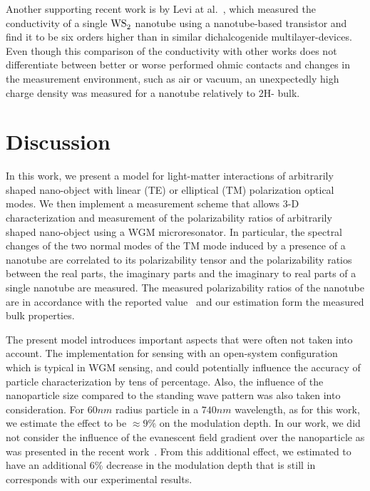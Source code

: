 \documentclass[journal=jacsat,manuscript=article]{achemso}
\begin{document}
Another supporting recent work is by Levi at al.~\cite{levi2013}, which measured the conductivity of a single $\ce{WS_2}$ nanotube using a nanotube-based transistor and find it to be six orders higher than in similar dichalcogenide multilayer-devices. Even though this comparison of the conductivity with other works does not differentiate between better or worse performed ohmic contacts and changes in the measurement environment, such as air or vacuum, an unexpectedly high charge density was measured for a  nanotube relatively to 2H- bulk.

\section{Discussion}

In this work, we present a model for light-matter interactions of arbitrarily shaped nano-object with linear (TE) or elliptical (TM) polarization optical modes. We then implement a measurement scheme that allows 3-D characterization and measurement of the polarizability ratios of arbitrarily shaped nano-object using a WGM microresonator. In particular, the spectral changes of the two normal modes of the TM mode induced by a presence of a  nanotube are correlated to its polarizability tensor and the polarizability ratios between the real parts, the imaginary parts and the imaginary to real parts of a single   nanotube are measured. The measured polarizability ratios of the  nanotube are in accordance with the reported value~\cite{tenne2005orientation} and our estimation form the measured bulk properties.

The present model introduces important aspects that were often not taken into account. The implementation for sensing with an open-system configuration which is typical in WGM sensing, and could potentially influence the accuracy of particle characterization by tens of percentage. Also, the influence of the nanoparticle size compared to the standing wave pattern was also taken into consideration. For $60nm$ radius particle in a $740 nm$ wavelength, as for this work, we estimate the effect to be $\approx 9\% $ on the modulation depth.
In our work, we did not consider the influence of the evanescent field gradient over the nanoparticle as was presented in the recent work~\cite{foreman2017Whispering}. From this additional effect, we estimated to have an additional $6 \% $ decrease in the modulation depth that is still in corresponds with our experimental results.
\end{document}
